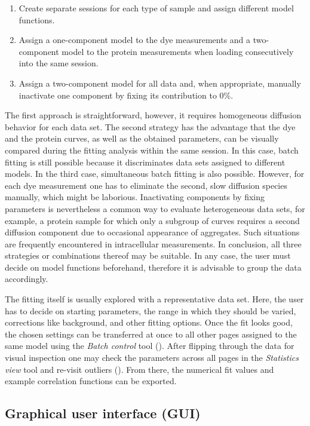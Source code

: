 \begin{enumerate}
\item Create separate sessions for each type of sample and assign different model functions.
\item Assign a one-component model to the dye measurements and a two-component model to the protein measurements when loading consecutively into the same session.
\item Assign a two-component model for all data and, when appropriate, manually inactivate one component by fixing its contribution to 0\%.
\end{enumerate}


The first approach is straightforward, however, it requires homogeneous diffusion behavior for each data set. The second strategy has the advantage that the dye and the protein curves, as well as the obtained parameters, can be visually compared during the fitting analysis within the same session. In this case, batch fitting is still possible because it discriminates data sets assigned to different models. In the third case, simultaneous batch fitting is also possible. However, for each dye measurement one has to eliminate the second, slow diffusion species manually, which might be laborious. Inactivating components by fixing parameters is nevertheless a common way to evaluate heterogeneous data sets, for example, a protein sample for which only a subgroup of curves requires a second diffusion component due to occasional appearance of aggregates. Such situations are frequently encountered in intracellular measurements. In conclusion, all three strategies or combinations thereof may be suitable. In any case, the user must decide on model functions beforehand, therefore it is advisable to group the data accordingly.

The fitting itself is usually explored with a representative data set. Here, the user has to decide on starting parameters, the range in which they should be varied, corrections like background, and other fitting options. Once the fit looks good, the chosen settings can be transferred at once to all other pages assigned to the same model using the \textit{Batch control} tool (). After flipping through the data for visual inspection one may check the parameters across all pages in the \textit{Statistics view} tool and re-visit outliers (). From there, the numerical fit values and example correlation functions can be exported.

\subsection{Graphical user interface (GUI)}
\label{sec:intro.graph}

